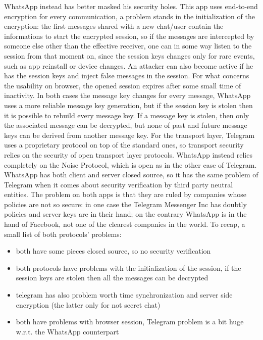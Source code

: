 \documentclass{article}
\begin{document}
WhatsApp instead has better masked his security holes. This app uses end-to-end encryption for every communication, a problem stands in the initialization of the encryption: the first messages shared with a new chat/user contain the informations to start the encrypted session, so if the messages are intercepted by someone else other than the effective receiver, one can in some way listen to the session from that moment on, since the session keys changes only for rare events, such as app reinstall or device changes. An attacker can also become active if he has the session keys and inject false messages in the session. For what concerns the usability on browser, the opened session expires after some small time of inactivity.\newline
In both cases the message key changes for every message, WhatsApp uses a more reliable message key generation, but if the session key is stolen then it is possible to rebuild every message key. If a message key is stolen, then only the associated message can be decrypted, but none of past and future message keys can be derived from another message key.\newline
For the transport layer, Telegram uses a proprietary protocol on top of the standard ones, so transport security relies on the security of open transport layer protocols. WhatsApp instead relies completely on the Noise Protocol, which is open as in the other case of Telegram.\newline
WhatsApp has both client and server closed source, so it has the same problem of Telegram when it comes about security verification by third party neutral entities.\newline
The problem on both apps is that they are ruled by companies whose policies are not so secure: in one case the Telegram Messenger Inc has doubtly policies \cite{tel_policy} and server keys are in their hand; on the contrary WhatsApp \cite{what_policy} is in the hand of Facebook, not one of the clearest companies in the world.\newline
To recap, a small list of both protocols' problems:

\begin{itemize}
	\item both have some pieces closed source, so no security verification
	\item both protocols have problems with the initialization of the session, if the session keys are stolen then all the messages can be decrypted
	\item telegram has also problem worth time synchronization and server side encryption (the latter only for not secret chat) 
	\item both have problems with browser session, Telegram problem is a bit huge w.r.t. the WhatsApp counterpart
\end{itemize}
\end{document}
